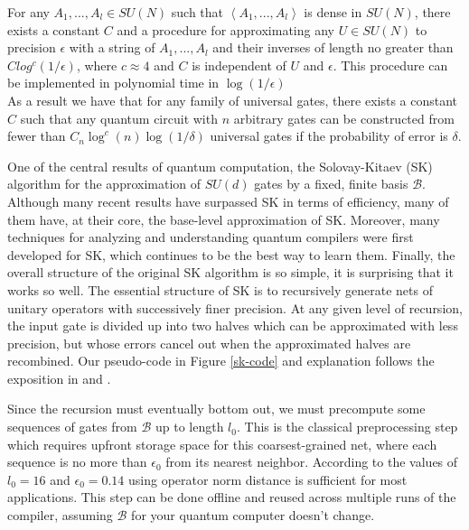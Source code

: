 \documentclass[a0,portrait]{a0poster}
\begin{document}
\begin{multicols}{2}
		\large{F}or any $A_1,...,A_l\in SU(N)$ such that $\left\langle A_1, . . . , A_{l}\right\rangle$ is dense in $SU(N)$, there exists a constant $C$ and a procedure for approximating any $U\in SU(N)$ to precision $\epsilon$ with a string of $A_1, . . . , A_l$ and their inverses of length no greater than $Clog^c(1/\epsilon)$, where $c\approx4$ and $C$ is independent of $U$ and $\epsilon$. This procedure can be implemented in polynomial time in $\log(1/\epsilon)$
		\\
		As a result we have that for any family of universal gates, there exists a constant $C$ such that any quantum circuit with $n$ arbitrary gates can be constructed from fewer than $ C_n \log^c(n) \log(1/\delta)$ universal gates if the probability of error is $\delta$.
		\\
		\color{SaddleBrown}
		
		
		
		
		One of the central results of quantum computation, the Solovay-Kitaev (SK) algorithm for the
		approximation of $SU(d)$ gates by a fixed, finite basis $\mathcal{B}$.
		Although many recent results have surpassed SK in terms of efficiency,
		many of them have, at their core, the base-level approximation of SK. Moreover, many techniques for analyzing
		and understanding quantum compilers were first developed for SK, which
		continues to be the best way to learn them. Finally, the overall
		structure of the original SK algorithm is so simple, it is surprising
		that it works so well.
		The essential structure of SK is to recursively generate nets of unitary
		operators with
		successively finer precision. At any given level of recursion, the input 
		gate is divided up into two halves which can be
		approximated with less precision, but whose errors cancel out
		when the approximated halves are recombined. Our pseudo-code 
		in Figure \ref{sk-code} and explanation
		follows the exposition in \cite{Dawson2005} and \cite{Harrow2001}.
		
		\color{DarkSlateGray} 
		
		Since the recursion must eventually bottom out, we must precompute some sequences
		of gates from $\mathcal{B}$ up to length $l_0$. This is the classical
		preprocessing step which requires upfront storage space for this
		coarsest-grained net, where
		each sequence is no more than $\epsilon_0$ from its nearest neighbor. According
		to \cite{Dawson2005} the values of $l_0=16$ and $\epsilon_0 = 0.14$ using
		operator norm distance is sufficient for most applications.
		This step can be
		done offline and reused across multiple runs of the compiler, assuming
		$\mathcal{B}$ for your quantum computer doesn't change.
		

\end{multicols}
\end{document}
